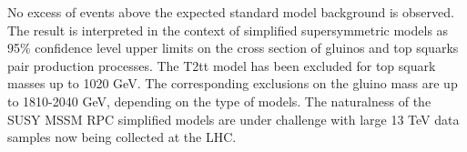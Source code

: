 \documentclass{PoS}
\begin{document}
No excess of events above the expected standard model background is observed. The result is interpreted in the context of simplified supersymmetric models as 95\% confidence level upper limits on the cross section of gluinos and top squarks pair production processes. The T2tt model has been excluded for top squark masses up to 1020 GeV. The corresponding exclusions on the gluino mass are up to 1810-2040 GeV, depending on the type of models. The naturalness\cite{Papucci:2011wy} of the SUSY MSSM RPC simplified models are under challenge with large 13 TeV data samples now being collected at the LHC.



\end{document}
